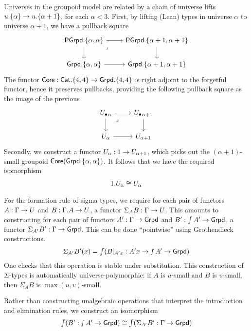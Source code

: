 \begin{definition}
Universes in the groupoid model are related by a chain of universe lifts
${u}.\{\alpha\} \to {u}.\{\alpha+1\}$, for each $\alpha < 3$.
First, by lifting (Lean) types in universe $\alpha$ to universe $\alpha+1$,
we have a pullback square
\[
\begin{tikzcd}
	{\PGrpd.\{\alpha,\alpha\}} & {\PGrpd.\{\alpha+1,\alpha+1\}} \\
	{\Grpd.\{\alpha,\alpha\}} & {\Grpd.\{\alpha+1,\alpha+1\}}
	\arrow[from=1-1, to=1-2]
	\arrow[from=1-1, to=2-1]
	\arrow[from=1-2, to=2-2]
	\arrow[from=2-1, to=2-2]
    \arrow["\lrcorner"{anchor=center, pos=0.125}, draw=none, from=1-1, to=2-2]
\end{tikzcd}
\]
The functor $\mathop{\mathsf{Core}} : \mathsf{Cat}.\{4,4\} \to \mathsf{Grpd}.\{4,4\}$ is right adjoint to the forgetful functor,
hence it preserves pullbacks,
providing the following pullback square as the image
of the previous
\[
\begin{tikzcd}
	{\Ulow_\alpha} & {\Ulow_{\alpha+1}} \\
	{\U_\alpha} & {\U_{\alpha+1}}
	\arrow[from=1-1, to=1-2]
	\arrow[from=1-1, to=2-1]
    \arrow["\lrcorner"{anchor=center, pos=0.125}, draw=none, from=1-1, to=2-2]
	\arrow[from=1-2, to=2-2]
	\arrow[from=2-1, to=2-2]
\end{tikzcd}
\]
Secondly, we construct a functor $U_\alpha : 1 \to U_{\alpha+1}$,
which picks out the $(\alpha+1)$-small groupoid $\mathop{\mathsf{Core}} (\mathsf{Grpd}.\{\alpha,\alpha\})$.
It follows that we have the required isomorphism
\[ 1 . U_\alpha \cong U_\alpha \]
\end{definition}

\begin{definition}
For the formation rule of sigma types,
we require for each pair of functors $A : \Gamma \to U$
and $B : \Gamma . A \to U$,
a functor $\Sigma_A B : \Gamma \to U$.
This amounts to constructing for each pair of functors
$A' : \Gamma \to \mathsf{Grpd}$
and $B' : \int A' \to \mathsf{Grpd}$,
a functor $\Sigma_{A'} B' : \Gamma \to \mathsf{Grpd}$.
This can be done ``pointwise'' using Grothendieck constructions.
\[ \textstyle \Sigma_{A'} B' (x) = \int (B |_{A' x} : A' x \to \smallint A' \to \mathsf{Grpd})\]
One checks that this operation is stable under substitution.
This construction of $\Sigma$-types is automatically universe-polymorphic:
if $A$ is $u$-small and $B$ is $v$-small, then $\Sigma_A B$ is $\max (u,v)$-small.

Rather than constructing unalgebraic operations that interpret the introduction
and elimination rules,
we construct an isomorphism
\[\textstyle\int (B' : \smallint A' \to \mathsf{Grpd}) \cong \int (\Sigma_{A'} B' : \Gamma \to \mathsf{Grpd})\]
\end{definition}

